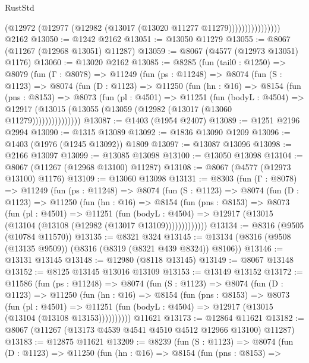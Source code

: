 \begin{lexlean}{RustStd}
\begin{coremodule}
                          (@12972 (@12977 (@12982 (@13017 (@13020 @11277 @11279))))))))))))))))
    @2162
@13050 := @1242 @2162
@13051 := @13050 @11279
@13055 := @8067 (@11267 (@12968 @13051) @11287)
@13059 := @8067 (@4577 (@12973 @13051) @1176)
@13060 := @13020 @2162
@13085 := @8285
    (fun (tail0 : @1250) =>
    @8079
      (fun (Γ : @8078) =>
      @11249
        (fun (ps : @11248) =>
        @8074
          (fun (S : @1123) =>
          @8074
            (fun (D : @1123) =>
            @11250
              (fun (hn : @16) =>
              @8154
                (fun (pns : @8153) =>
                @8073
                  (fun (pl : @4501) =>
                  @11251
                    (fun (bodyL : @4504) =>
                    @12917 (@13015 (@13055 (@13059 (@12982 (@13017 (@13060 @11279)))))))))))))))
@13087 := @1403 (@1954 @2407)
@13089 := @1251 @2196 @2994
@13090 := @1315 @13089
@13092 := @1836 @13090 @1209
@13096 := @1403 (@1976 (@1245 @13092)) @1809
@13097 := @13087 @13096
@13098 := @2166 @13097
@13099 := @13085 @13098
@13100 := @13050 @13098
@13104 := @8067 (@11267 (@12968 @13100) @11287)
@13108 := @8067 (@4577 (@12973 @13100) @1176)
@13109 := @13060 @13098
@13131 := @8303
    (fun (Γ : @8078) =>
    @11249
      (fun (ps : @11248) =>
      @8074
        (fun (S : @1123) =>
        @8074
          (fun (D : @1123) =>
          @11250
            (fun (hn : @16) =>
            @8154
              (fun (pns : @8153) =>
              @8073
                (fun (pl : @4501) =>
                @11251
                  (fun (bodyL : @4504) =>
                  @12917 (@13015 (@13104 (@13108 (@12982 (@13017 @13109)))))))))))))
@13134 := @8316 (@9505 (@10784 @11570))
@13135 := @8321 @324
@13145 := @13134 (@8316 (@9508 (@13135 @9509)) (@8316 (@8319 (@8321 @439 @8324)) @8106))
@13146 := @13131 @13145
@13148 := @12980 (@8118 @13145)
@13149 := @8067 @13148
@13152 := @8125 @13145 @13016 @13109
@13153 := @13149 @13152
@13172 := @11586
    (fun (ps : @11248) =>
    @8074
      (fun (S : @1123) =>
      @8074
        (fun (D : @1123) =>
        @11250
          (fun (hn : @16) =>
          @8154
            (fun (pns : @8153) =>
            @8073
              (fun (pl : @4501) =>
              @11251 (fun (bodyL : @4504) => @12917 (@13015 (@13104 (@13108 @13153))))))))))
    @11621
@13173 := @12864 @11621
@13182 := @8067 (@11267 (@13173 @4539 @4541 @4510 @4512 @12966 @13100) @11287)
@13183 := @12875 @11621
@13209 := @8239
    (fun (S : @1123) =>
    @8074
      (fun (D : @1123) =>
      @11250
        (fun (hn : @16) =>
        @8154
          (fun (pns : @8153) =>

\end{coremodule}
\end{lexlean}
